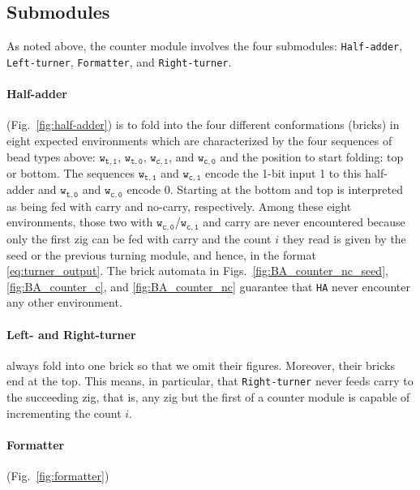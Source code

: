 \documentclass[runningheads]{llncs}
\begin{document}
	\subsection{Submodules}
	\label{ap_subsect:Counter_submodules}

As noted above, the counter module involves the four submodules: \texttt{Half-adder}, \texttt{Left-turner}, \texttt{Formatter}, and \texttt{Right-turner}. 

\paragraph{Half-adder} (Fig.~\ref{fig:half-adder}) is to fold into the four different conformations (bricks) in eight expected environments which are characterized by the four sequences of bead types above: $\mathtt{w_{t, 1}}$, $\mathtt{w_{t, 0}}$, $\mathtt{w_{c, 1}}$, and $\mathtt{w_{c, 0}}$ and the position to start folding: top or bottom. 
The sequences $\mathtt{w_{t, 1}}$ and $\mathtt{w_{c, 1}}$ encode the 1-bit input 1 to this half-adder and $\mathtt{w_{t, 0}}$ and $\mathtt{w_{c, 0}}$ encode 0. 
Starting at the bottom and top is interpreted as being fed with carry and no-carry, respectively. 
Among these eight environments, those two with $\mathtt{w_{c, 0}}$/$\mathtt{w_{c, 1}}$ and carry are never encountered because only the first zig can be fed with carry and the count $i$ they read is given by the seed or the previous turning module, and hence, in the format \eqref{eq:turner_output}. 
The brick automata in Figs.~\ref{fig:BA_counter_nc_seed}, \ref{fig:BA_counter_c}, and \ref{fig:BA_counter_nc} guarantee that \texttt{HA} never encounter any other environment. 

\paragraph{Left- and Right-turner} always fold into one brick so that we omit their figures. 
Moreover, their bricks end at the top. 
This means, in particular, that \texttt{Right-turner} never feeds carry to the succeeding zig, that is, any zig but the first of a counter module is capable of incrementing the count $i$. 

\paragraph{Formatter} (Fig.~\ref{fig:formatter}) 
\end{document}
